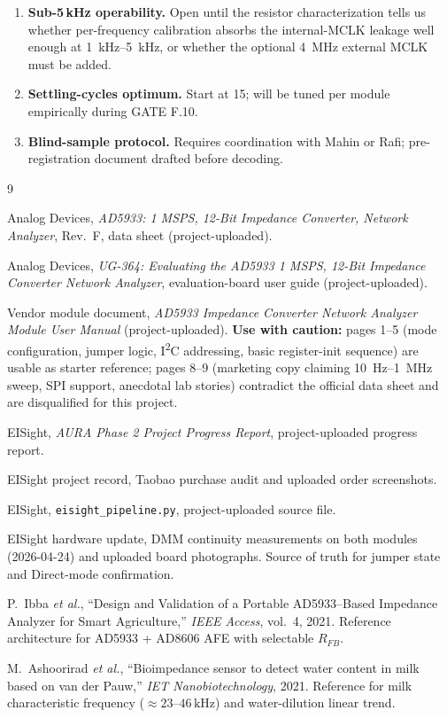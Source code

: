 \documentclass[11pt,a4paper]{article}
\begin{document}
\begin{enumerate}
\item \textbf{Sub-5\,kHz operability.} Open until the resistor characterization tells us whether per-frequency calibration absorbs the internal-MCLK leakage well enough at \SIrange{1}{5}{\kilo\hertz}, or whether the optional \SI{4}{\mega\hertz} external MCLK must be added.
\item \textbf{Settling-cycles optimum.} Start at 15; will be tuned per module empirically during GATE F.10.
\item \textbf{Blind-sample protocol.} Requires coordination with Mahin or Rafi; pre-registration document drafted before decoding.
\end{enumerate}

\begin{thebibliography}{9}

Analog Devices, \textit{AD5933: 1 MSPS, 12-Bit Impedance Converter, Network Analyzer}, Rev.~F, data sheet (project-uploaded).

Analog Devices, \textit{UG-364: Evaluating the AD5933 1 MSPS, 12-Bit Impedance Converter Network Analyzer}, evaluation-board user guide (project-uploaded).

Vendor module document, \textit{AD5933 Impedance Converter Network Analyzer Module User Manual} (project-uploaded). \textbf{Use with caution:} pages 1--5 (mode configuration, jumper logic, I\textsuperscript{2}C addressing, basic register-init sequence) are usable as starter reference; pages 8--9 (marketing copy claiming \SI{10}{\hertz}--\SI{1}{\mega\hertz} sweep, SPI support, anecdotal lab stories) contradict the official data sheet and are disqualified for this project.

EISight, \textit{AURA Phase 2 Project Progress Report}, project-uploaded progress report.

EISight project record, Taobao purchase audit and uploaded order screenshots.

EISight, \texttt{eisight\_pipeline.py}, project-uploaded source file.

EISight hardware update, DMM continuity measurements on both modules (2026-04-24) and uploaded board photographs. Source of truth for jumper state and Direct-mode confirmation.

P.\ Ibba \emph{et al.}, ``Design and Validation of a Portable AD5933--Based Impedance Analyzer for Smart Agriculture,'' \textit{IEEE Access}, vol.~4, 2021. Reference architecture for AD5933 + AD8606 AFE with selectable $R_{FB}$.

M.\ Ashoorirad \emph{et al.}, ``Bioimpedance sensor to detect water content in milk based on van der Pauw,'' \textit{IET Nanobiotechnology}, 2021. Reference for milk characteristic frequency ($\approx 23$--$46\,\mathrm{kHz}$) and water-dilution linear trend.

\end{thebibliography}
\end{document}
